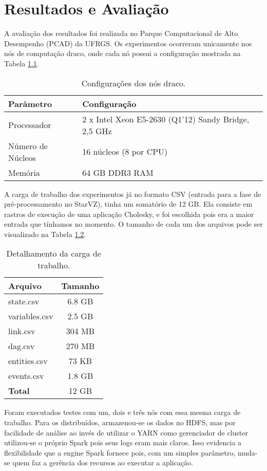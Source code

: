 \chapter{Resultados e Avaliação} \label{ch:evaluation}

A avaliação dos resultados foi realizada no Parque Computacional de Alto 
Desempenho (PCAD) da UFRGS. Os experimentos ocorreram unicamente nos nós de 
computação draco, onde cada nó possui a configuração mostrada na Tabela 
\ref{tab:draco_config}.

\begin{table}[H]
\centering
\begin{tabular}{l l} \toprule
\textbf{Parâmetro}  &  \textbf{Configuração} \\ 
\midrule
Processador     & 2 x Intel Xeon E5-2630 (Q1'12) Sandy Bridge, 2,5 GHz  
\\
Número de Núcleos    & 16 núcleos (8 por CPU)  \\
Memória       & 64 GB DDR3 RAM   \\
\end{tabular}
\caption{Configurações dos nós draco.}
\label{tab:draco_config}
\end{table}

A carga de trabalho dos experimentos já no formato CSV (entrada para a fase de 
pré-processamento no StarVZ), tinha um somatório de 12 GB. Ela consiste em 
rastros de execução de uma aplicação Cholesky, e foi escolhida pois era a maior
entrada que tínhamos no momento. O tamanho de cada um dos arquivos pode ser 
visualizado na Tabela \ref{tab:input_sz}.

\begin{table}[H]
\centering
\begin{tabular}{l c} \toprule
\textbf{Arquivo}  &  \textbf{Tamanho} \\ 
\midrule
state.csv	& 6.8 GB \\
variables.csv  	& 2.5 GB \\
link.csv       	& 304 MB \\
dag.csv        	& 270 MB \\
entities.csv	& 73 KB \\
events.csv	& 1.8 GB \\
\textbf{Total}  & 12 GB  \\
\end{tabular}
\caption{Detalhamento da carga de trabalho.}
\label{tab:input_sz}
\end{table}

Foram executados testes com um, dois e três nós com essa mesma carga de 
trabalho. Para os distribuídos, armazenou-se os dados no HDFS, mas por 
facilidade de análise ao invés de utilizar o YARN como gerenciador de cluster 
utilizou-se o próprio Spark pois seus logs eram mais claros. Isso evidencia a 
flexibilidade que a engine Spark fornece pois, com um simples parâmetro, 
muda-se quem faz a gerência dos recursos ao executar a aplicação.



